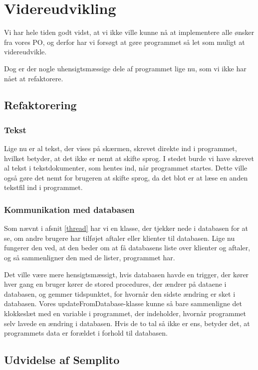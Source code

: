 \section{Videreudvikling}
\label{kapitel:Videreudvikling}

Vi har hele tiden godt vidst, at vi ikke ville kunne nå at implementere alle ønsker fra vores PO, og derfor har vi forsøgt at gøre programmet så let som muligt at videreudvikle.

Dog er der nogle uhensigtsmæssige dele af programmet lige nu, som vi ikke har nået at refaktorere.

\subsection{Refaktorering}
\subsubsection{Tekst}
Lige nu er al tekst, der vises på skærmen, skrevet direkte ind i programmet, hvilket betyder, at det ikke er nemt at skifte sprog.
I stedet burde vi have skrevet al tekst i tekstdokumenter, som hentes ind, når programmet startes.
Dette ville også gøre det nemt for brugeren at skifte sprog, da det blot er at læse en anden tekstfil ind i programmet.

\subsubsection{Kommunikation med databasen}
Som nævnt i afsnit \ref{thread} har vi en klasse, der tjekker nede i databasen for at se, om andre brugere har tilføjet aftaler eller klienter til databasen.
Lige nu fungerer den ved, at den beder om at få databasens liste over klienter og aftaler, og så sammenligner den med de lister, programmet har.

Det ville være mere hensigtsmæssigt, hvis databasen havde en trigger, der kører hver gang en bruger kører de stored procedures, der ændrer på dataene i databasen, og gemmer tidspunktet, for hvornår den sidste ændring er sket i databasen.
Vores updateFromDatabase-klasse kunne så bare sammenligne det klokkeslæt med en variable i programmet, der indeholder, hvornår programmet selv lavede en ændring i databasen.
Hvis de to tal så ikke er ens, betyder det, at programmets data er forældet i forhold til databasen.

\subsection{Udvidelse af Semplito}

